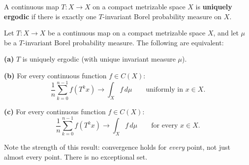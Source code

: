 \begin{definition}\label{def:9.21.}
A continuous map $T: X \to X$ on a compact metrizable space $X$ is \textbf{uniquely ergodic} if there is exactly one $T$-invariant Borel probability measure on $X$.
\end{definition}


\begin{theorem}\label{thm:9.22}
Let $T: X \to X$ be a continuous map on a compact metrizable space $X$, and let $\mu$ be a $T$-invariant Borel probability measure. The following are equivalent:

\textbf{(a)} $T$ is uniquely ergodic (with unique invariant measure $\mu$).

\textbf{(b)} For every continuous function $f \in C(X)$:
\[
\frac{1}{n} \sum_{k=0}^{n-1} f(T^k x) \to \int_X f \, d\mu \qquad \text{uniformly in } x \in X.
\]

\textbf{(c)} For every continuous function $f \in C(X)$:
\[
\frac{1}{n} \sum_{k=0}^{n-1} f(T^k x) \to \int_X f \, d\mu \qquad \text{for every } x \in X.
\]

Note the strength of this result: convergence holds for \textit{every} point, not just almost every point. There is no exceptional set.
\end{theorem}


